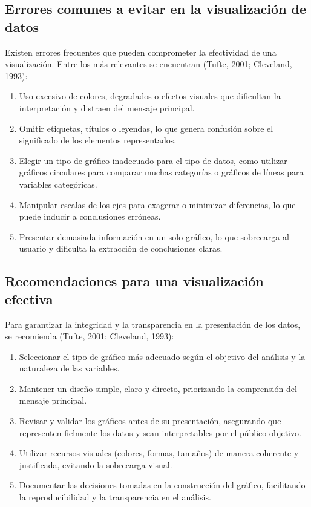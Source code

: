 \documentclass[
  spanish,
  a4paper,
  DIV=11,
  numbers=noendperiod,
  onepage,
  openany]{scrreprt}
\begin{document}
\subsection{Errores comunes a evitar en la visualización de
datos}\label{errores-comunes-a-evitar-en-la-visualizaciuxf3n-de-datos}

Existen errores frecuentes que pueden comprometer la efectividad de una
visualización. Entre los más relevantes se encuentran (Tufte, 2001;
Cleveland, 1993):

\begin{enumerate}
\def\labelenumi{\arabic{enumi}.}
\item
  Uso excesivo de colores, degradados o efectos visuales que dificultan
  la interpretación y distraen del mensaje principal.
\item
  Omitir etiquetas, títulos o leyendas, lo que genera confusión sobre el
  significado de los elementos representados.
\item
  Elegir un tipo de gráfico inadecuado para el tipo de datos, como
  utilizar gráficos circulares para comparar muchas categorías o
  gráficos de líneas para variables categóricas.
\item
  Manipular escalas de los ejes para exagerar o minimizar diferencias,
  lo que puede inducir a conclusiones erróneas.
\item
  Presentar demasiada información en un solo gráfico, lo que sobrecarga
  al usuario y dificulta la extracción de conclusiones claras.
\end{enumerate}

\subsection{Recomendaciones para una visualización
efectiva}\label{recomendaciones-para-una-visualizaciuxf3n-efectiva}

Para garantizar la integridad y la transparencia en la presentación de
los datos, se recomienda (Tufte, 2001; Cleveland, 1993):

\begin{enumerate}
\def\labelenumi{\arabic{enumi}.}
\item
  Seleccionar el tipo de gráfico más adecuado según el objetivo del
  análisis y la naturaleza de las variables.
\item
  Mantener un diseño simple, claro y directo, priorizando la comprensión
  del mensaje principal.
\item
  Revisar y validar los gráficos antes de su presentación, asegurando
  que representen fielmente los datos y sean interpretables por el
  público objetivo.
\item
  Utilizar recursos visuales (colores, formas, tamaños) de manera
  coherente y justificada, evitando la sobrecarga visual.
\item
  Documentar las decisiones tomadas en la construcción del gráfico,
  facilitando la reproducibilidad y la transparencia en el análisis.
\end{enumerate}
\end{document}
